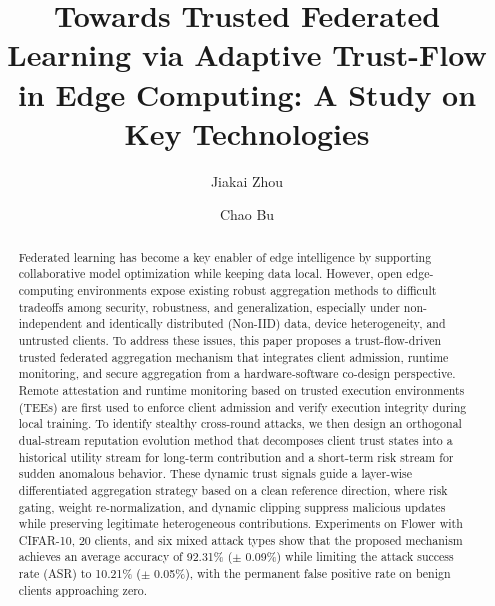 \documentclass[final,5p,times,twocolumn]{elsarticle/elsarticle}
\begin{document}
\begin{frontmatter}

    \title{Towards Trusted Federated Learning via Adaptive Trust-Flow in Edge Computing: A Study on Key Technologies}

    \author[inst1]{Jiakai Zhou}
    \author[inst1]{Chao Bu}



    \begin{abstract}
        Federated learning has become a key enabler of edge intelligence by
        supporting collaborative model optimization while keeping data local.
        However, open edge-computing environments expose existing robust aggregation
        methods to difficult tradeoffs among security, robustness, and
        generalization, especially under non-independent and identically distributed
        (Non-IID) data, device heterogeneity, and untrusted clients. To address
        these issues, this paper proposes a trust-flow-driven trusted federated
        aggregation mechanism that integrates client admission, runtime monitoring,
        and secure aggregation from a hardware-software co-design perspective.
        Remote attestation and runtime monitoring based on trusted execution
        environments (TEEs) are first used to enforce client admission and verify
        execution integrity during local training. To identify stealthy cross-round
        attacks, we then design an orthogonal dual-stream reputation evolution
        method that decomposes client trust states into a historical utility stream
        for long-term contribution and a short-term risk stream for sudden
        anomalous behavior. These dynamic trust signals guide a layer-wise
        differentiated aggregation strategy based on a clean reference direction,
        where risk gating, weight re-normalization, and dynamic clipping suppress
        malicious updates while preserving legitimate heterogeneous contributions.
        Experiments on Flower with CIFAR-10, 20 clients, and six mixed attack types
        show that the proposed mechanism achieves an average accuracy of 92.31\%
        ($\pm$ 0.09\%) while limiting the attack success rate (ASR) to 10.21\%
        ($\pm$ 0.05\%), with the permanent false positive rate on benign clients
        approaching zero.
    \end{abstract}


\end{frontmatter}
\end{document}
